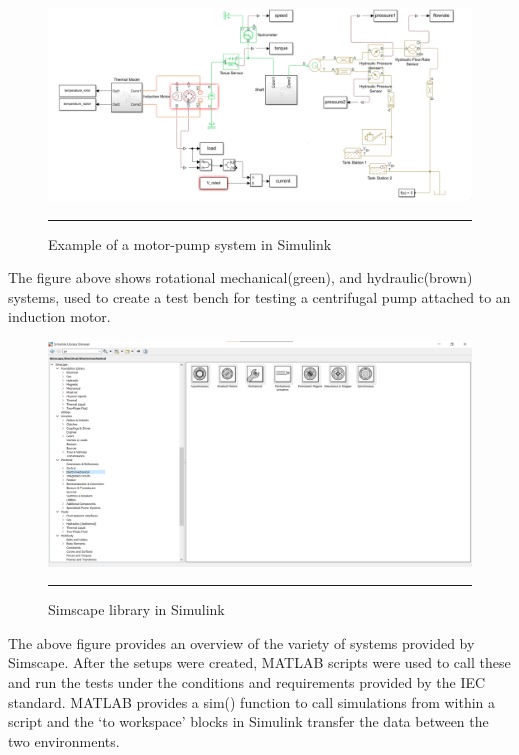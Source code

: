 \begin{figure}[htbp]
	\centering
		\includegraphics[width = 4.5in]{./Figures/MS/fig31.png}
		\rule{35em}{0.5pt}
	\caption{Example of a motor-pump system in Simulink}
	\label{fig:Example of a motor-pump system in Simulink}
\end{figure}
The figure above shows rotational mechanical(green), and hydraulic(brown) systems, used to create a test bench for testing a centrifugal pump attached to an induction motor. 
\begin{figure}[htbp]
	\centering
		\includegraphics[width = 4.5in]{./Figures/MS/fig32.png}
		\rule{35em}{0.5pt}
	\caption{Simscape library in Simulink}
	\label{fig:Simscape library in Simulink}
\end{figure}
The above figure provides an overview of the variety of systems provided by Simscape. 
After the setups were created, MATLAB scripts were used to call these and run the tests under the conditions and requirements provided by the IEC standard. MATLAB provides a sim() function to call simulations from within a script and the ‘to workspace’ blocks in Simulink transfer the data between the two environments.

